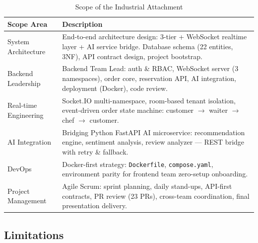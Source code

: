 \begin{table}[H]
\centering
\caption{Scope of the Industrial Attachment}
\label{tab:scope}
\begin{tabularx}{\textwidth}{@{}p{}X@{}}
\toprule
\textbf{Scope Area} & \textbf{Description} \\
\midrule
System Architecture & End-to-end architecture design: 3-tier + WebSocket realtime layer + AI service bridge. Database schema (22 entities, 3NF), API contract design, project bootstrap. \\
Backend Leadership & Backend Team Lead: auth \& RBAC, WebSocket server (3 namespaces), order core, reservation API, AI integration, deployment (Docker), code review. \\
Real-time Engineering & Socket.IO multi-namespace, room-based tenant isolation, event-driven order state machine: customer $\rightarrow$ waiter $\rightarrow$ chef $\rightarrow$ customer. \\
AI Integration & Bridging Python FastAPI AI microservice: recommendation engine, sentiment analysis, review analyzer --- REST bridge with retry \& fallback. \\
DevOps & Docker-first strategy: \texttt{Dockerfile}, \texttt{compose.yaml}, environment parity for frontend team zero-setup onboarding. \\
Project Management & Agile Scrum: sprint planning, daily stand-ups, API-first contracts, PR review (23 PRs), cross-team coordination, final presentation delivery. \\
\bottomrule
\end{tabularx}
\end{table}

\subsection{Limitations}

